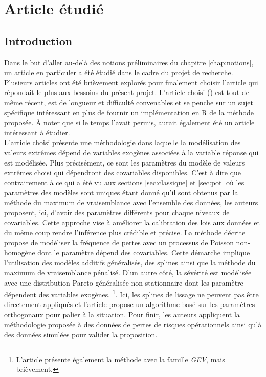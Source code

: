 \chapter{Article étudié}
\label{chap:article}

\section{Introduction}
\label{sec:introar}
Dans le but d'aller au-delà des notions préliminaires du chapitre \ref{chap:notions}, un article en particuler a été étudié dans le cadre du projet de recherche. Plusieurs articles ont été brièvement explorés pour finalement choisir l'article qui répondait le plus aux bessoins du présent projet. L'article choisi (\cite{chavez2016extreme}) est tout de même récent, est de longueur et difficulté convenables et se penche sur un sujet spécifique intéressant en plus de fournir un implémentation en \textsf{R} de la méthode proposée. À noter que si le temps l'avait permis, \cite{thiombiano2017nonstationary} aurait également été un article intéressant à étudier. \\

L'article choisi présente une méthodologie dans laquelle la modélisation des valeurs extrêmes dépend de variables exogènes associées à la variable réponse qui est modélisée. Plus précisément, ce sont les paramètres du modèle de valeurs extrêmes choisi qui dépendront des covariables disponibles. C'est à dire que contrairement à ce qui a été vu aux sections \ref{sec:classique} et \ref{sec:pot} où les paramètres des modèles sont uniques étant donné qu'il sont obtenus par la méthode du maximum de vraisemblance avec l'ensemble des données, les auteurs proposent, ici, d'avoir des paramètres différents pour chaque niveaux de covariables. Cette approche vise à améliorer la calibration des lois aux données et du même coup rendre l'inférence plus crédible et précise. La méthode décrite propose de modéliser la fréquence de pertes avec un processus de Poisson non-homogène dont le paramètre dépend des covariables. Cette démarche implique l'utilisation des modèles additifs généralisés, des splines ainsi que la méthode du maximum de vraisemblance pénalisé. D'un autre côté, la sévérité est modélisée avec une distribution Pareto généralisée non-stationnaire dont les paramètre dépendent des variables exogènes. \footnote{L'article présente également la méthode avec la famille \textit{GEV}, mais brièvement.}. Ici, les splines de lissage ne peuvent pas être directement appliqués et l'article propose un algorithme basé sur les paramètres orthogonaux pour palier à la situation. Pour finir, les auteurs appliquent la méthodologie proposée à des données de pertes de risques opérationnels ainsi qu'à des données simulées pour valider la proposition.
\\

